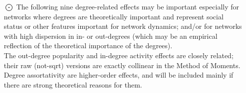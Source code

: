 \documentclass[a4paper,fleqn,11pt]{article}
\newcommand{\+}{\, + \,}
\begin{document}
\begin{enumerate}
\item[{\hspace*{-1ex}$\bigodot$}]
     The following nine degree-related effects may be important especially for networks
     where degrees are theoretically important and represent social status
     or other features important for network dynamics;
     and/or for networks with high dispersion in in- or out-degrees
     (which may be an empirical reflection of the theoretical importance
     of the degrees).\\
     The out-degree popularity and in-degree activity effects are closely
     related; their raw (not-sqrt) versions are exactly collinear in the
     Method of Moments.\\
     Degree assortativity are higher-order effects, and will be included
     mainly if there are strong theoretical reasons for them.


\end{enumerate}
\end{document}
